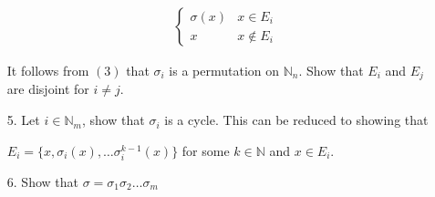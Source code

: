 \documentclass{article}
\begin{document}
\begin{itemize}
\begin{center}
\begin{align*}
\begin{cases}
      \sigma(x) & x\in E_i \\
      x & x\notin E_i
    \end{cases}
    \end{align*}
    \end{center}
    It follows from $(3)$ that $\sigma_i$ is a permutation on $\mathbb{N}_n$. Show that $E_i$ and $E_j$ are disjoint for $i\ne j$.
    \item [5.] Let $i\in\mathbb{N}_m$, show that $\sigma_i$ is a cycle. This can be reduced to showing that
    \begin{center}
        $E_i = \{x, \sigma_i(x), \dots \sigma_i^{k-1}(x)\}$ for some $k\in\mathbb{N}$ and $x\in E_i$.
    \end{center}
    \item [6.] Show that $\sigma = \sigma_1\sigma_2\dots\sigma_m$
    

\end{itemize}
\end{document}
